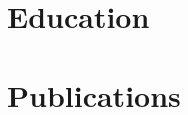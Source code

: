 \documentclass[11pt, a4paper]{article}
\begin{document}
\section*{Education}
{\scriptsize
  \educationWithDuration
}

\section*{Publications}
{\scriptsize
  \publications
}

\end{document}
